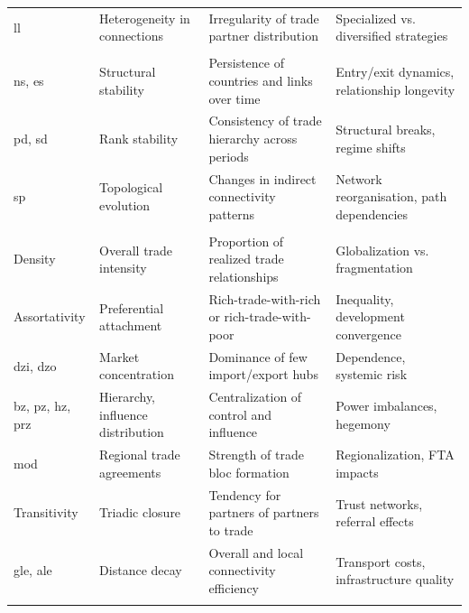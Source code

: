 \documentclass[preprint, 3p,
authoryear]{elsarticle} %
\begin{document}
\begin{longtable}{p{2.5cm}p{3cm}p{4.5cm}p{5cm}}
\gls{ll} & Heterogeneity in connections & Irregularity of trade partner distribution & Specialized vs. diversified strategies \\
\addlinespace

\midrule
\multicolumn{4}{l}{\textit{\textbf{Similarity Indicators}}} \\
\midrule

\gls{ns}, \gls{es} & Structural stability & Persistence of countries and links over time & Entry/exit dynamics, relationship longevity \\
\addlinespace

\gls{pd}, \gls{sd} & Rank stability & Consistency of trade hierarchy across periods & Structural breaks, regime shifts \\
\addlinespace

\gls{sp} & Topological evolution & Changes in indirect connectivity patterns & Network reorganisation, path dependencies \\
\addlinespace

\midrule
\multicolumn{4}{l}{\textit{\textbf{Network-Level Indicators}}} \\
\midrule

Density & Overall trade intensity & Proportion of realized trade relationships & Globalization vs. fragmentation \\
\addlinespace

Assortativity & Preferential attachment & Rich-trade-with-rich or rich-trade-with-poor & Inequality, development convergence \\
\addlinespace

\gls{dzi}, \gls{dzo} & Market concentration & Dominance of few import/export hubs & Dependence, systemic risk \\
\addlinespace

\gls{bz}, \gls{pz}, \gls{hz}, \gls{prz} & Hierarchy, influence distribution & Centralization of control and influence & Power imbalances, hegemony \\
\addlinespace

\gls{mod} & Regional trade agreements & Strength of trade bloc formation & Regionalization, FTA impacts \\
\addlinespace

Transitivity & Triadic closure & Tendency for partners of partners to trade & Trust networks, referral effects \\
\addlinespace

\gls{gle}, \gls{ale} & Distance decay & Overall and local connectivity efficiency & Transport costs, infrastructure quality \\
\addlinespace


\end{longtable}
\end{document}
